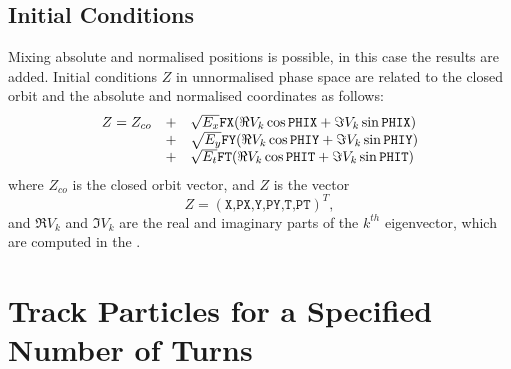 \subsection{Initial Conditions}
Mixing absolute and normalised positions is possible,
in this case the results are added.
Initial conditions $Z$ in unnormalised phase space are related 
to the closed orbit and the absolute and normalised coordinates as follows:
\[
\begin{array}{rcl}
  Z = Z_{co}&+& \sqrt{E_x} \hbox{\tt FX}
  (\Re V_k \cos \hbox{\tt PHIX} + \Im V_k \sin \hbox{\tt PHIX}) \\
  &+& \sqrt{E_y} \hbox{\tt FY}
  (\Re V_k \cos \hbox{\tt PHIY} + \Im V_k \sin \hbox{\tt PHIY}) \\
  &+& \sqrt{E_t} \hbox{\tt FT}
  (\Re V_k \cos \hbox{\tt PHIT} + \Im V_k \sin \hbox{\tt PHIT})
\end{array}
\]
where $Z_{co}$ is the closed orbit vector, and $Z$ is the vector 
\[
Z = (\texttt{X,PX,Y,PY,T,PT})^T,
\]
and $\Re V_k$ and $\Im V_k$ are the real and imaginary parts of the 
$k^{th}$ eigenvector,
which are computed in the .

\section{Track Particles for a Specified Number of Turns}
\label{sec:trackrun}

